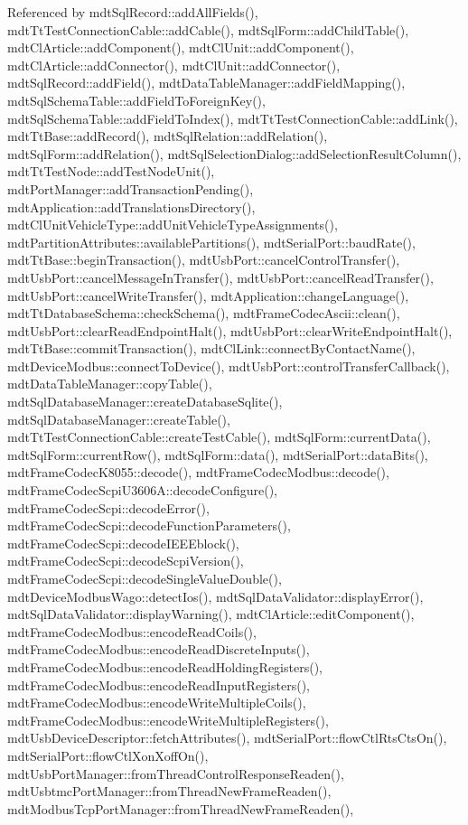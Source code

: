 Referenced by mdt\-Sql\-Record\-::add\-All\-Fields(), mdt\-Tt\-Test\-Connection\-Cable\-::add\-Cable(), mdt\-Sql\-Form\-::add\-Child\-Table(), mdt\-Cl\-Article\-::add\-Component(), mdt\-Cl\-Unit\-::add\-Component(), mdt\-Cl\-Article\-::add\-Connector(), mdt\-Cl\-Unit\-::add\-Connector(), mdt\-Sql\-Record\-::add\-Field(), mdt\-Data\-Table\-Manager\-::add\-Field\-Mapping(), mdt\-Sql\-Schema\-Table\-::add\-Field\-To\-Foreign\-Key(), mdt\-Sql\-Schema\-Table\-::add\-Field\-To\-Index(), mdt\-Tt\-Test\-Connection\-Cable\-::add\-Link(), mdt\-Tt\-Base\-::add\-Record(), mdt\-Sql\-Relation\-::add\-Relation(), mdt\-Sql\-Form\-::add\-Relation(), mdt\-Sql\-Selection\-Dialog\-::add\-Selection\-Result\-Column(), mdt\-Tt\-Test\-Node\-::add\-Test\-Node\-Unit(), mdt\-Port\-Manager\-::add\-Transaction\-Pending(), mdt\-Application\-::add\-Translations\-Directory(), mdt\-Cl\-Unit\-Vehicle\-Type\-::add\-Unit\-Vehicle\-Type\-Assignments(), mdt\-Partition\-Attributes\-::available\-Partitions(), mdt\-Serial\-Port\-::baud\-Rate(), mdt\-Tt\-Base\-::begin\-Transaction(), mdt\-Usb\-Port\-::cancel\-Control\-Transfer(), mdt\-Usb\-Port\-::cancel\-Message\-In\-Transfer(), mdt\-Usb\-Port\-::cancel\-Read\-Transfer(), mdt\-Usb\-Port\-::cancel\-Write\-Transfer(), mdt\-Application\-::change\-Language(), mdt\-Tt\-Database\-Schema\-::check\-Schema(), mdt\-Frame\-Codec\-Ascii\-::clean(), mdt\-Usb\-Port\-::clear\-Read\-Endpoint\-Halt(), mdt\-Usb\-Port\-::clear\-Write\-Endpoint\-Halt(), mdt\-Tt\-Base\-::commit\-Transaction(), mdt\-Cl\-Link\-::connect\-By\-Contact\-Name(), mdt\-Device\-Modbus\-::connect\-To\-Device(), mdt\-Usb\-Port\-::control\-Transfer\-Callback(), mdt\-Data\-Table\-Manager\-::copy\-Table(), mdt\-Sql\-Database\-Manager\-::create\-Database\-Sqlite(), mdt\-Sql\-Database\-Manager\-::create\-Table(), mdt\-Tt\-Test\-Connection\-Cable\-::create\-Test\-Cable(), mdt\-Sql\-Form\-::current\-Data(), mdt\-Sql\-Form\-::current\-Row(), mdt\-Sql\-Form\-::data(), mdt\-Serial\-Port\-::data\-Bits(), mdt\-Frame\-Codec\-K8055\-::decode(), mdt\-Frame\-Codec\-Modbus\-::decode(), mdt\-Frame\-Codec\-Scpi\-U3606\-A\-::decode\-Configure(), mdt\-Frame\-Codec\-Scpi\-::decode\-Error(), mdt\-Frame\-Codec\-Scpi\-::decode\-Function\-Parameters(), mdt\-Frame\-Codec\-Scpi\-::decode\-I\-E\-E\-Eblock(), mdt\-Frame\-Codec\-Scpi\-::decode\-Scpi\-Version(), mdt\-Frame\-Codec\-Scpi\-::decode\-Single\-Value\-Double(), mdt\-Device\-Modbus\-Wago\-::detect\-Ios(), mdt\-Sql\-Data\-Validator\-::display\-Error(), mdt\-Sql\-Data\-Validator\-::display\-Warning(), mdt\-Cl\-Article\-::edit\-Component(), mdt\-Frame\-Codec\-Modbus\-::encode\-Read\-Coils(), mdt\-Frame\-Codec\-Modbus\-::encode\-Read\-Discrete\-Inputs(), mdt\-Frame\-Codec\-Modbus\-::encode\-Read\-Holding\-Registers(), mdt\-Frame\-Codec\-Modbus\-::encode\-Read\-Input\-Registers(), mdt\-Frame\-Codec\-Modbus\-::encode\-Write\-Multiple\-Coils(), mdt\-Frame\-Codec\-Modbus\-::encode\-Write\-Multiple\-Registers(), mdt\-Usb\-Device\-Descriptor\-::fetch\-Attributes(), mdt\-Serial\-Port\-::flow\-Ctl\-Rts\-Cts\-On(), mdt\-Serial\-Port\-::flow\-Ctl\-Xon\-Xoff\-On(), mdt\-Usb\-Port\-Manager\-::from\-Thread\-Control\-Response\-Readen(), mdt\-Usbtmc\-Port\-Manager\-::from\-Thread\-New\-Frame\-Readen(), mdt\-Modbus\-Tcp\-Port\-Manager\-::from\-Thread\-New\-Frame\-Readen(), 